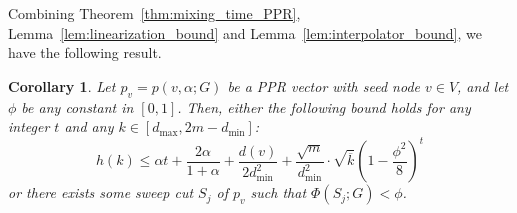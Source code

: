 \documentclass[11pt,twoside]{article}
\newtheorem{corollary}{Corollary}
\newcommand{\1}{\mathbf{1}}
\begin{document}
Combining Theorem~\ref{thm:mixing_time_PPR}, Lemma~\ref{lem:linearization_bound} and Lemma~\ref{lem:interpolator_bound}, we have the following result.
\begin{corollary}
	\label{cor:mixing_time_PPR}
	Let $p_v = p(v,\alpha;G)$ be a PPR vector with seed node $v \in V$, and let $\phi$ be any constant in $[0,1]$. Then, either the following bound holds for any integer $t$ and any $k \in [d_{\max},2m - d_{\min}]$:
	\begin{equation*}
	h(k) \leq \alpha t + \frac{2\alpha}{1 + \alpha} + \frac{d(v)}{2d_{\min}^2} + \frac{\sqrt{m}}{d_{\min}^2} \cdot \sqrt{\overline{k}} \left(1 - \frac{\phi^2}{8}\right)^{t}
	\end{equation*}
	or there exists some sweep cut $S_j$ of $p_v$ such that $\Phi(S_j;G) < \phi$.
\end{corollary}
\end{document}
